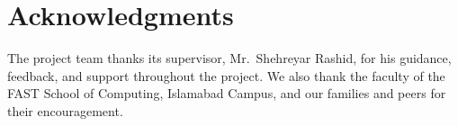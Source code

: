 \chapter*{Acknowledgments}
The project team thanks its supervisor, Mr.\ Shehreyar Rashid, for his guidance, feedback, and support throughout the project. We also thank the faculty of the FAST School of Computing, Islamabad Campus, and our families and peers for their encouragement.
